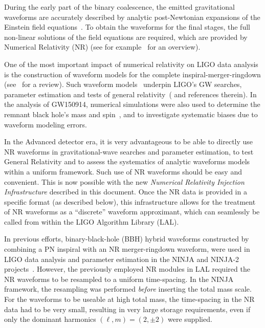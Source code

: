\documentclass[11pt,tightenlines,article,amssymb,amsmath,amsfonts,superscriptaddress]{revtex4}
\begin{document}
During the early part of the binary coalescence, the emitted gravitational waveforms are accurately described by
analytic post-Newtonian expansions of the Einstein field equations~\cite{lrr-2014-2}. 
To obtain the waveforms for the final stages, the full non-linear solutions
of the field equations are required, which are provided by Numerical Relativity (NR) (see for example~\cite{Centrella:2010mx} for an overview).

One of the most important impact of numerical relativity on LIGO data analysis
is the construction of waveform models for the complete inspiral-merger-ringdown (see~\cite{Ohme:2011rm} for a review). Such waveform models~\cite{Khan:2015jqa, Taracchini:2013rva} underpin LIGO's  GW searches, parameter estimation and tests of general relativity~(\cite{Abbott:2016blz} and references therein).  In the analysis of GW150914, numerical simulations were also used to determine the remnant black hole's mass and spin~\cite{Healy:2014yta}, and to investigate systematic biases due to waveform modeling errors.

In the Advanced detector era, it is very advantageous to be able to directly use NR waveforms in gravitational-wave searches
and parameter estimation, to test General Relativity and to assess the systematics of analytic waveforms models within
a uniform framework. Such use of NR waveforms should be easy and convenient.
This is now possible with the new \emph{Numerical Relativity Injection Infrastructure} described in this document. Once the NR data is provided in a specific format (as described below), this infrastructure allows for the treatment of
NR waveforms as a ``discrete'' waveform approximant, which can seamlessly be called from within the LIGO Algorithm Library (LAL).

In previous efforts, binary-black-hole (BBH) hybrid waveforms constructed by combining a PN inspiral with an NR merger-ringdown 
waveform, were used in LIGO data analysis and parameter estimation in the NINJA and NINJA-2 projects~\cite{Aylott:2009ya, Aasi:2014tra}.  
However, the previously employed NR modules in LAL
required the NR waveforms to be resampled to a uniform time-spacing. In the NINJA framework, the resampling was performed \emph{before} inserting the total mass scale.  For the waveforms to be
useable at high total mass, the time-spacing in the NR data had to be very small, resulting in very large storage requirements, even if only the dominant harmonics $(\ell,m)=(2,\pm 2)$ were supplied.
\end{document}
